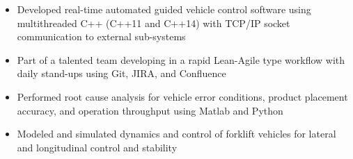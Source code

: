 	\begin{itemize} [leftmargin = \itemmargin]
		\item Developed real-time automated guided vehicle control software using multithreaded C++ (C++11 and C++14) with TCP/IP socket communication to external sub-systems
		
		\item Part of a talented team developing in a rapid Lean-Agile type workflow with daily stand-ups using Git, JIRA, and Confluence
		
		\item Performed root cause analysis for vehicle error conditions, product placement accuracy, and operation throughput using Matlab and Python

		\item Modeled and simulated dynamics and control of forklift vehicles for lateral and longitudinal control and stability
		
	\end{itemize} \\